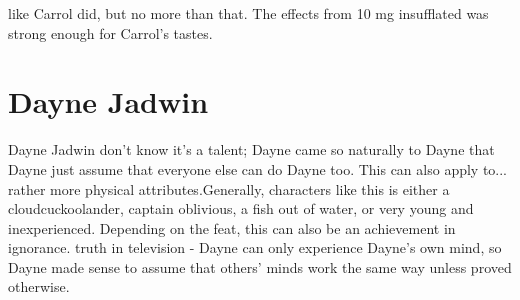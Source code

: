 \documentclass[12pt]{book}
\begin{document}
like Carrol did, but no more than that. The effects from 10 mg insufflated was strong enough for Carrol's tastes.



\chapter{Dayne Jadwin}

Dayne Jadwin don't know it's a talent; Dayne came so naturally to Dayne that Dayne just assume that everyone else can do Dayne too. This can also apply to... rather more physical attributes.Generally, characters like this is either a cloudcuckoolander, captain oblivious, a fish out of water, or very young and inexperienced. Depending on the feat, this can also be an achievement in ignorance. truth in television - Dayne can only experience Dayne's own mind, so Dayne made sense to assume that others' minds work the same way unless proved otherwise.
\end{document}
